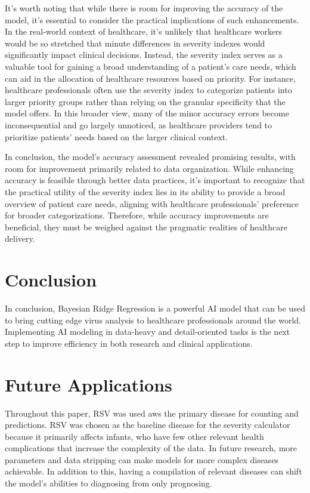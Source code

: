 \documentclass{article}
\begin{document}
It's worth noting that while there is room for improving the accuracy of the model,
it's essential to consider the practical implications of such enhancements. In the real-world context of healthcare, it's unlikely that healthcare workers would be so
stretched that minute differences in severity indexes would significantly impact clinical
decisions. Instead, the severity index serves as a valuable tool for gaining a broad
understanding of a patient's care needs, which can aid in the allocation of healthcare
resources based on priority. For instance, healthcare professionals often use the severity index to categorize
patients into larger priority groups rather than relying on the granular specificity that the
model offers. In this broader view, many of the minor accuracy errors become
inconsequential and go largely unnoticed, as healthcare providers tend to prioritize
patients' needs based on the larger clinical context.

In conclusion, the model's accuracy assessment revealed promising results, with
room for improvement primarily related to data organization. While enhancing accuracy
is feasible through better data practices, it's important to recognize that the practical
utility of the severity index lies in its ability to provide a broad overview of patient care
needs, aligning with healthcare professionals' preference for broader categorizations.
Therefore, while accuracy improvements are beneficial, they must be weighed against the
pragmatic realities of healthcare delivery.


\section{Conclusion}
In conclusion, Bayesian Ridge Regression is a powerful AI model that can be used
to bring cutting edge virus analysis to healthcare professionals around the world.
Implementing AI modeling in data-heavy and detail-oriented tasks is the next step to
improve efficiency in both research and clinical applications.


\section{Future Applications}
Throughout this paper, RSV was used aws the primary disease for counting and
predictions. RSV was chosen as the baseline disease for the severity calculator because it
primarily affects infants, who have few other relevant health complications that increase
the complexity of the data. In future research, more parameters and data stripping can
make models for more complex diseases achievable. In addition to this, having a
compilation of relevant diseases can shift the model’s abilities to diagnosing from only
prognosing.
\end{document}
